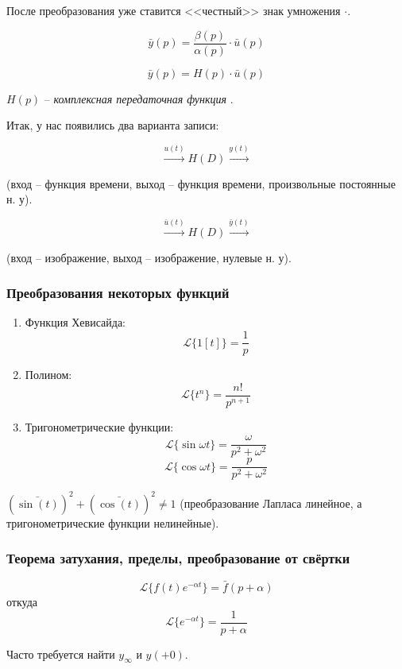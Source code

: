 \documentclass[main.tex]{subfiles}
\begin{document}
После преобразования уже ставится <<честный>> знак умножения $ \cdot $.

\[ \bar y(p) = \frac{\beta(p)}{\alpha(p)} \cdot \bar u(p) \]

\begin{equation}\label{eq:transmit_func}
    \boxed{\bar{y}(p) = H(p) \cdot \bar{u}(p) }
\end{equation}

$ H(p) $ -- \emph{ комплексная передаточная функция }.

Итак, у нас появились два варианта записи:

$$ \xrightarrow{u(t)} \boxed{H(D)}\xrightarrow{y(t)} $$

(вход -- функция времени, выход -- функция времени, произвольные постоянные н. у).

$$ \xrightarrow{\bar u(t)} \boxed{H(D)} \xrightarrow{ \bar y(t)} $$

(вход -- изображение, выход -- изображение, нулевые н. у).

\subsubsection{Преобразования некоторых функций}

\begin{enumerate}[noitemsep]
    \item Функция Хевисайда:
    \[ \mathcal{L} \{ 1[t] \} = \frac{1}{p} \]
    \item Полином:
    \[ \mathcal{L}\{ t^n \} = \frac{n!}{p^{n+1}} \]
    \item Тригонометрические функции:
    \[ \mathcal{L}\{ \sin \omega t \} = \frac{\omega}{p^2 + \omega^2} \]
    \[ \mathcal{L}\{ \cos \omega t \} = \frac{p}{p^2 + \omega^2} \]

\end{enumerate}

$ (\bar{\sin(t)})^2 + (\bar{\cos(t)})^2 \ne 1 $ (преобразование Лапласа линейное, а тригонометрические функции нелинейные).

\subsubsection{ Теорема затухания, пределы, преобразование от свёртки }

\[ \mathcal{L}\{ f(t)e^{- \alpha t} \} = \bar f(p+\alpha) \]
откуда
\[ \mathcal{L}\{ e^{- \alpha t} \} = \frac{1}{p+\alpha} \]

Часто требуется найти $ y_\infty $ и $ y(+0) $.
\end{document}
